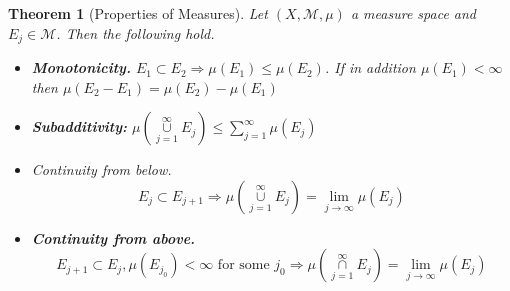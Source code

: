 \documentclass[12pt]{report}
\newtheorem{theorem}{Theorem}[section]
\begin{document}
\begin{theorem} [Properties of Measures]   Let $(X,
\mathcal{M}, \mu)$ a measure space and $E_j \in \mathcal{M}$. Then the
following hold.
\begin{itemize}
\item[1.]{\bf Monotonicity.}  $E_1 \subset E_2 \Longrightarrow
\mu(E_1) \le \mu(E_2)$.  If in addition  $\mu(E_1)<\infty$ then
 $\mu(E_2 -E_1) =\mu(E_2) -\mu(E_1)
$
\item[2.] {\bf Subadditivity:}  $\displaystyle{\mu
\left (\overset{\infty}{\underset{j=1}{\cup}}  E_j\right ) \le
\sum^\infty_{j=1}
\mu(E_j)}$
\item[3.]  Continuity from below.
\[ E_j \subset E_{j+1} \Longrightarrow \mu \left (
\overset{\infty}{\underset{j=1}{\cup}}  E_j\right ) = \lim_{j \to \infty}
\mu(E_j)
\]
\item[4.] {\bf Continuity from above.}
\[ E_{j+1} \subset E_j, \mu(E_{j_0}) < \infty \mbox{ for some } j_0
\Longrightarrow\mu\left (
\overset{\infty}{\underset{j=1}{\cap}}  E_j
\right ) = \lim_{j \to \infty} \mu(E_j)
\]
\end{itemize}
\end{theorem}
\end{document}
